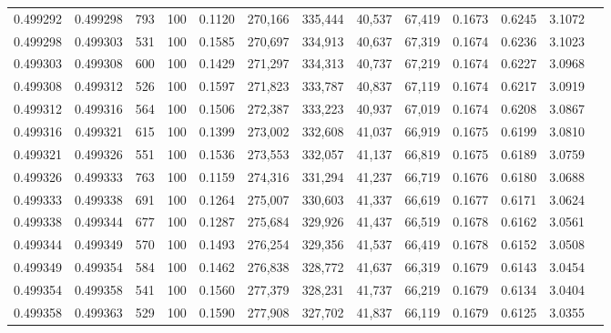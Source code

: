\begin{tabular}{rrrrrrrrrrrrr}
0.499292 & 0.499298 &   793 & 100 &                                     0.1120 & 270,166 & 335,444 &  40,537 &  67,419 & 0.1673 & 0.6245 & 3.1072 \\
0.499298 & 0.499303 &   531 & 100 &                                     0.1585 & 270,697 & 334,913 &  40,637 &  67,319 & 0.1674 & 0.6236 & 3.1023 \\
0.499303 & 0.499308 &   600 & 100 &                                     0.1429 & 271,297 & 334,313 &  40,737 &  67,219 & 0.1674 & 0.6227 & 3.0968 \\
0.499308 & 0.499312 &   526 & 100 &                                     0.1597 & 271,823 & 333,787 &  40,837 &  67,119 & 0.1674 & 0.6217 & 3.0919 \\
0.499312 & 0.499316 &   564 & 100 &                                     0.1506 & 272,387 & 333,223 &  40,937 &  67,019 & 0.1674 & 0.6208 & 3.0867 \\
0.499316 & 0.499321 &   615 & 100 &                                     0.1399 & 273,002 & 332,608 &  41,037 &  66,919 & 0.1675 & 0.6199 & 3.0810 \\
0.499321 & 0.499326 &   551 & 100 &                                     0.1536 & 273,553 & 332,057 &  41,137 &  66,819 & 0.1675 & 0.6189 & 3.0759 \\
0.499326 & 0.499333 &   763 & 100 &                                     0.1159 & 274,316 & 331,294 &  41,237 &  66,719 & 0.1676 & 0.6180 & 3.0688 \\
0.499333 & 0.499338 &   691 & 100 &                                     0.1264 & 275,007 & 330,603 &  41,337 &  66,619 & 0.1677 & 0.6171 & 3.0624 \\
0.499338 & 0.499344 &   677 & 100 &                                     0.1287 & 275,684 & 329,926 &  41,437 &  66,519 & 0.1678 & 0.6162 & 3.0561 \\
0.499344 & 0.499349 &   570 & 100 &                                     0.1493 & 276,254 & 329,356 &  41,537 &  66,419 & 0.1678 & 0.6152 & 3.0508 \\
0.499349 & 0.499354 &   584 & 100 &                                     0.1462 & 276,838 & 328,772 &  41,637 &  66,319 & 0.1679 & 0.6143 & 3.0454 \\
0.499354 & 0.499358 &   541 & 100 &                                     0.1560 & 277,379 & 328,231 &  41,737 &  66,219 & 0.1679 & 0.6134 & 3.0404 \\
0.499358 & 0.499363 &   529 & 100 &                                     0.1590 & 277,908 & 327,702 &  41,837 &  66,119 & 0.1679 & 0.6125 & 3.0355 \\

\end{tabular}
